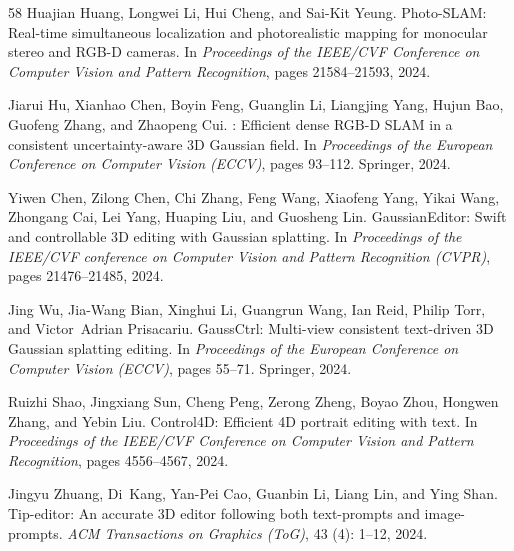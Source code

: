 \documentclass{article}
\begin{document}
\begin{thebibliography}{58}
Huajian Huang, Longwei Li, Hui Cheng, and Sai-Kit Yeung.
\newblock Photo-{SLAM}: Real-time simultaneous localization and photorealistic
  mapping for monocular stereo and {RGB-D} cameras.
\newblock In \emph{Proceedings of the IEEE/CVF Conference on Computer Vision
  and Pattern Recognition}, pages 21584--21593, 2024.

Jiarui Hu, Xianhao Chen, Boyin Feng, Guanglin Li, Liangjing Yang, Hujun Bao,
  Guofeng Zhang, and Zhaopeng Cui.
: Efficient dense {RGB-D} {SLAM} in a consistent
  uncertainty-aware 3{D} {G}aussian field.
\newblock In \emph{Proceedings of the European Conference on Computer Vision
  (ECCV)}, pages 93--112. Springer, 2024.

Yiwen Chen, Zilong Chen, Chi Zhang, Feng Wang, Xiaofeng Yang, Yikai Wang,
  Zhongang Cai, Lei Yang, Huaping Liu, and Guosheng Lin.
\newblock Gaussian{E}ditor: Swift and controllable 3{D} editing with {G}aussian
  splatting.
\newblock In \emph{Proceedings of the IEEE/CVF conference on Computer Vision
  and Pattern Recognition (CVPR)}, pages 21476--21485, 2024{}.

Jing Wu, Jia-Wang Bian, Xinghui Li, Guangrun Wang, Ian Reid, Philip Torr, and
  Victor~Adrian Prisacariu.
\newblock Gauss{C}trl: Multi-view consistent text-driven 3{D} {G}aussian
  splatting editing.
\newblock In \emph{Proceedings of the European Conference on Computer Vision
  (ECCV)}, pages 55--71. Springer, 2024.

Ruizhi Shao, Jingxiang Sun, Cheng Peng, Zerong Zheng, Boyao Zhou, Hongwen
  Zhang, and Yebin Liu.
\newblock Control4{D}: Efficient 4{D} portrait editing with text.
\newblock In \emph{Proceedings of the IEEE/CVF Conference on Computer Vision
  and Pattern Recognition}, pages 4556--4567, 2024.

Jingyu Zhuang, Di~Kang, Yan-Pei Cao, Guanbin Li, Liang Lin, and Ying Shan.
\newblock Tip-editor: An accurate 3{D} editor following both text-prompts and
  image-prompts.
\newblock \emph{ACM Transactions on Graphics (ToG)}, 43 (4):
  1--12, 2024.


\end{thebibliography}
\end{document}

